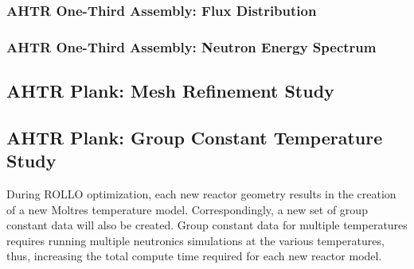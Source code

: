 \subsubsection{AHTR One-Third Assembly: Flux Distribution}
\subsubsection{AHTR One-Third Assembly: Neutron Energy Spectrum}

\subsection{AHTR Plank: Mesh Refinement Study}

\subsection{AHTR Plank: Group Constant Temperature Study}
During ROLLO optimization, each new reactor geometry results in the creation of 
a new Moltres temperature model. 
Correspondingly, a new set of group constant data will also be created. 
Group constant data for multiple temperatures requires running multiple neutronics 
simulations at the various temperatures, thus, increasing the total compute time 
required for each new reactor model. 

